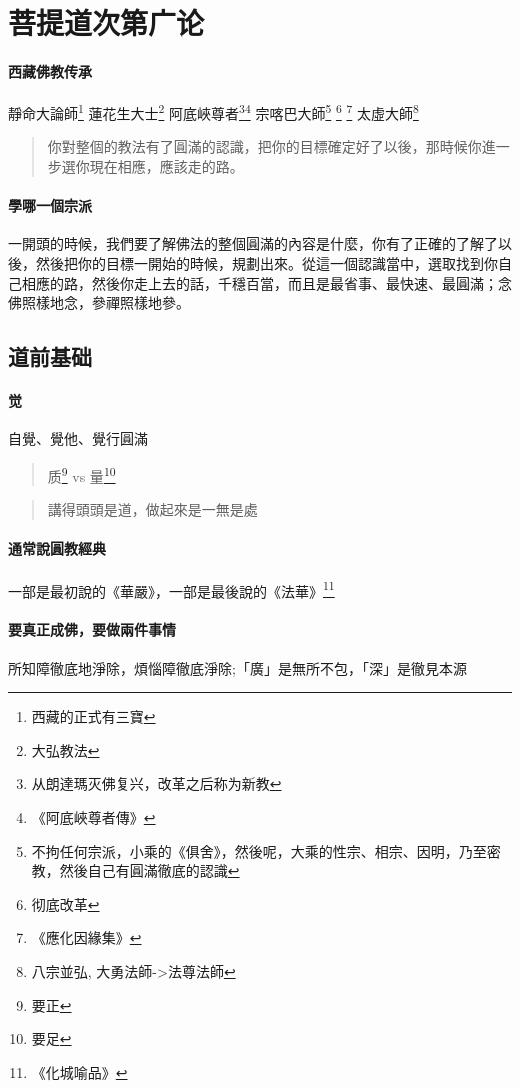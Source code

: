 \section{菩提道次第广论}

\paragraph{西藏佛教传承}
靜命大論師\footnote{西藏的正式有三寶}
蓮花生大士\footnote{大弘教法}
阿底峽尊者\footnote{从朗達瑪灭佛复兴，改革之后称为新教}\footnote{《阿底峽尊者傳》}
宗喀巴大師\footnote{不拘任何宗派，小乘的《俱舍》，然後呢，大乘的性宗、相宗、因明，乃至密教，然後自己有圓滿徹底的認識}
\footnote{彻底改革}
\footnote{《應化因緣集》}
太虛大師\footnote{八宗並弘, 大勇法師->法尊法師}

\begin{quote}
  你對整個的教法有了圓滿的認識，把你的目標確定好了以後，那時候你進一步選你現在相應，應該走的路。
\end{quote}
\paragraph{學哪一個宗派}
一開頭的時候，我們要了解佛法的整個圓滿的內容是什麼，你有了正確的了解了以後，然後把你的目標一開始的時候，規劃出來。從這一個認識當中，選取找到你自己相應的路，然後你走上去的話，千穩百當，而且是最省事、最快速、最圓滿；念佛照樣地念，參禪照樣地參。



\subsection{道前基础}
\paragraph{觉}自覺、覺他、覺行圓滿
\begin{quote}
  质\footnote{要正} vs 量\footnote{要足}
\end{quote}
\begin{quote}
  講得頭頭是道，做起來是一無是處
\end{quote}
\paragraph{通常說圓教經典}一部是最初說的《華嚴》，一部是最後說的《法華》\footnote{《化城喻品》}
\paragraph{要真正成佛，要做兩件事情}所知障徹底地淨除，煩惱障徹底淨除;「廣」是無所不包，「深」是徹見本源
